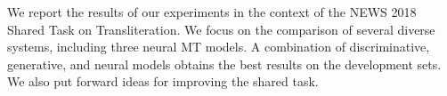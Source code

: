 We report the results of our experiments in the context of the NEWS 2018 Shared Task on Transliteration. We focus on the comparison of several diverse systems, including three neural MT models. A combination of discriminative, generative, and neural models obtains the best results on the development sets. We also put forward ideas for improving the shared task.
